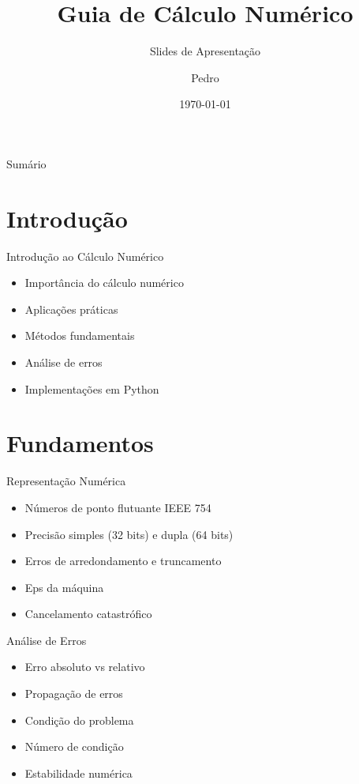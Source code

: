 \documentclass[11pt]{beamer}
\title{Guia de Cálculo Numérico}
\subtitle{Slides de Apresentação}
\author{Pedro}
\institute{Universidade}
\date{\today}
\numberwithin{equation}{section}
\begin{document}
\begin{frame}
\titlepage
\end{frame}

\begin{frame}{Sumário}
\tableofcontents
\end{frame}

\section{Introdução}
\begin{frame}{Introdução ao Cálculo Numérico}
\begin{itemize}
\item Importância do cálculo numérico
\item Aplicações práticas
\item Métodos fundamentais
\item Análise de erros
\item Implementações em Python
\end{itemize}
\end{frame}

\section{Fundamentos}
\begin{frame}{Representação Numérica}
\begin{itemize}
\item Números de ponto flutuante IEEE 754
\item Precisão simples (32 bits) e dupla (64 bits)
\item Erros de arredondamento e truncamento
\item Eps da máquina
\item Cancelamento catastrófico
\end{itemize}
\end{frame}

\begin{frame}{Análise de Erros}
\begin{itemize}
\item Erro absoluto vs relativo
\item Propagação de erros
\item Condição do problema
\item Número de condição
\item Estabilidade numérica
\end{itemize}
\end{frame}
\end{document}
